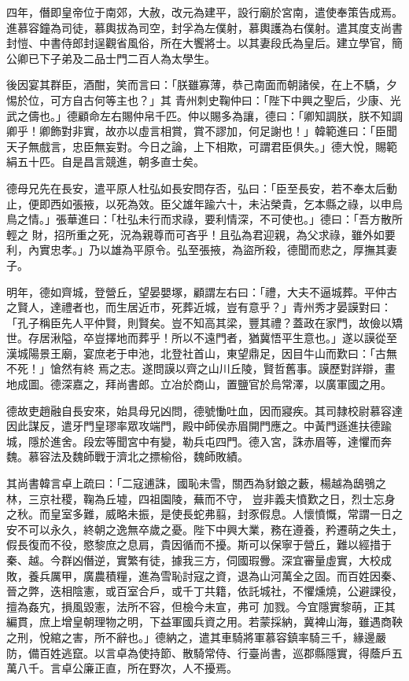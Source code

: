\begin{pinyinscope}
 四年，僭即皇帝位于南郊，大赦，改元為建平，設行廟於宮南，遣使奉策告成焉。進慕容鐘為司徒，慕輿拔為司空，封孚為左僕射，慕輿護為右僕射。遣其度支尚書封愷、中書侍郎封逞觀省風俗，所在大饗將士。以其妻段氏為皇后。建立學官，簡公卿已下子弟及二品士門二百人為太學生。



 後因宴其群臣，酒酣，笑而言曰：「朕雖寡薄，恭己南面而朝諸侯，在上不驕，夕惕於位，可方自古何等主也？」其
 青州刺史鞠仲曰：「陛下中興之聖后，少康、光武之儔也。」德顧命左右賜仲帛千匹。仲以賜多為讓，德曰：「卿知調朕，朕不知調卿乎！卿飾對非實，故亦以虛言相賞，賞不謬加，何足謝也！」韓範進曰：「臣聞天子無戲言，忠臣無妄對。今日之論，上下相欺，可謂君臣俱失。」德大悅，賜範絹五十匹。自是昌言競進，朝多直士矣。



 德母兄先在長安，遣平原人杜弘如長安問存否，弘曰：「臣至長安，若不奉太后動止，便即西如張掖，以死為效。臣父雄年踰六十，未沾榮貴，乞本縣之祿，以申烏鳥之情。」張華進曰：「杜弘未行而求祿，要利情深，不可使也。」德曰：「吾方散所輕之
 財，招所重之死，況為親尊而可吝乎！且弘為君迎親，為父求祿，雖外如要利，內實忠孝。」乃以雄為平原令。弘至張掖，為盜所殺，德聞而悲之，厚撫其妻子。



 明年，德如齊城，登營丘，望晏嬰塚，顧謂左右曰：「禮，大夫不逼城葬。平仲古之賢人，達禮者也，而生居近市，死葬近城，豈有意乎？」青州秀才晏謨對曰：「孔子稱臣先人平仲賢，則賢矣。豈不知高其梁，豐其禮？蓋政在家門，故儉以矯世。存居湫隘，卒豈擇地而葬乎！所以不遠門者，猶冀悟平生意也。」遂以謨從至漢城陽景王廟，宴庶老于申池，北登社首山，東望鼎足，因目牛山而歎曰：「古無不死！」愴然有終
 焉之志。遂問謨以齊之山川丘陵，賢哲舊事。謨歷對詳辯，畫地成圖。德深嘉之，拜尚書郎。立冶於商山，置鹽官於烏常澤，以廣軍國之用。



 德故吏趙融自長安來，始具母兄凶問，德號慟吐血，因而寢疾。其司隸校尉慕容達因此謀反，遣牙門皇璆率眾攻端門，殿中師侯赤眉開門應之。中黃門遜進扶德踰城，隱於進舍。段宏等聞宮中有變，勒兵屯四門。德入宮，誅赤眉等，達懼而奔魏。慕容法及魏師戰于濟北之摽榆俗，魏師敗績。



 其尚書韓言卓上疏曰：「二寇逋誅，國恥未雪，關西為豺鋃之藪，楊越為鴟鴞之林，三京社稷，鞠為丘墟，四祖園陵，蕪而不守，
 豈非義夫憤歎之日，烈士忘身之秋。而皇室多難，威略未振，是使長蛇弗翦，封豕假息。人懷憤慨，常謂一日之安不可以永久，終朝之逸無卒歲之憂。陛下中興大業，務在遵養，矜遷萌之失土，假長復而不役，愍黎庶之息肩，貴因循而不擾。斯可以保寧于營丘，難以經措于秦、越。今群凶僭逆，實繁有徒，據我三方，伺國瑕釁。深宜審量虛實，大校成敗，養兵厲甲，廣農積糧，進為雪恥討寇之資，退為山河萬全之固。而百姓因秦、晉之弊，迭相陰憲，或百室合戶，或千丁共籍，依託城社，不懼燻燒，公避課役，擅為姦宄，損風毀憲，法所不容，但檢今未宣，弗可
 加戮。今宜隱實黎萌，正其編貫，庶上增皇朝理物之明，下益軍國兵資之用。若蒙採納，冀裨山海，雖遇商鞅之刑，悅綰之害，所不辭也。」德納之，遣其車騎將軍慕容鎮率騎三千，緣邊嚴防，備百姓逃竄。以言卓為使持節、散騎常侍、行臺尚書，巡郡縣隱實，得蔭戶五萬八千。言卓公廉正直，所在野次，人不擾焉。




\end{pinyinscope}
